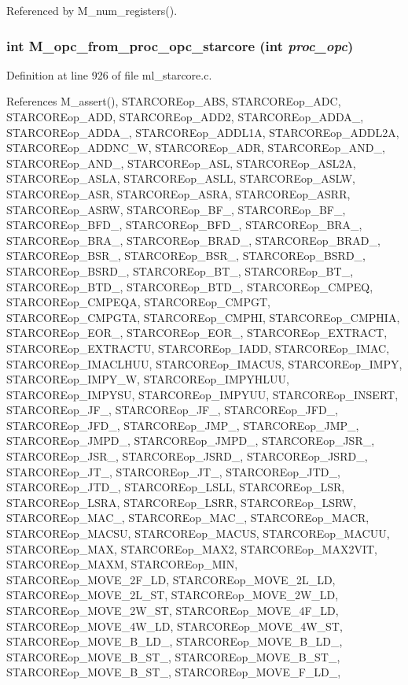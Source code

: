 Referenced by M\_\-num\_\-registers().
\subsubsection{\setlength{\rightskip}{0pt plus 5cm}int M\_\-opc\_\-from\_\-proc\_\-opc\_\-starcore (int {\em proc\_\-opc})}\label{m__starcore_8h_8dcb2892a44c63d537237a3b93236df3}




Definition at line 926 of file ml\_\-starcore.c.

References M\_\-assert(), STARCOREop\_\-ABS, STARCOREop\_\-ADC, STARCOREop\_\-ADD, STARCOREop\_\-ADD2, STARCOREop\_\-ADDA\_, STARCOREop\_\-ADDA\_, STARCOREop\_\-ADDL1A, STARCOREop\_\-ADDL2A, STARCOREop\_\-ADDNC\_\-W, STARCOREop\_\-ADR, STARCOREop\_\-AND\_, STARCOREop\_\-AND\_, STARCOREop\_\-ASL, STARCOREop\_\-ASL2A, STARCOREop\_\-ASLA, STARCOREop\_\-ASLL, STARCOREop\_\-ASLW, STARCOREop\_\-ASR, STARCOREop\_\-ASRA, STARCOREop\_\-ASRR, STARCOREop\_\-ASRW, STARCOREop\_\-BF\_, STARCOREop\_\-BF\_, STARCOREop\_\-BFD\_, STARCOREop\_\-BFD\_, STARCOREop\_\-BRA\_, STARCOREop\_\-BRA\_, STARCOREop\_\-BRAD\_, STARCOREop\_\-BRAD\_, STARCOREop\_\-BSR\_, STARCOREop\_\-BSR\_, STARCOREop\_\-BSRD\_, STARCOREop\_\-BSRD\_, STARCOREop\_\-BT\_, STARCOREop\_\-BT\_, STARCOREop\_\-BTD\_, STARCOREop\_\-BTD\_, STARCOREop\_\-CMPEQ, STARCOREop\_\-CMPEQA, STARCOREop\_\-CMPGT, STARCOREop\_\-CMPGTA, STARCOREop\_\-CMPHI, STARCOREop\_\-CMPHIA, STARCOREop\_\-EOR\_, STARCOREop\_\-EOR\_, STARCOREop\_\-EXTRACT, STARCOREop\_\-EXTRACTU, STARCOREop\_\-IADD, STARCOREop\_\-IMAC, STARCOREop\_\-IMACLHUU, STARCOREop\_\-IMACUS, STARCOREop\_\-IMPY, STARCOREop\_\-IMPY\_\-W, STARCOREop\_\-IMPYHLUU, STARCOREop\_\-IMPYSU, STARCOREop\_\-IMPYUU, STARCOREop\_\-INSERT, STARCOREop\_\-JF\_, STARCOREop\_\-JF\_, STARCOREop\_\-JFD\_, STARCOREop\_\-JFD\_, STARCOREop\_\-JMP\_, STARCOREop\_\-JMP\_, STARCOREop\_\-JMPD\_, STARCOREop\_\-JMPD\_, STARCOREop\_\-JSR\_, STARCOREop\_\-JSR\_, STARCOREop\_\-JSRD\_, STARCOREop\_\-JSRD\_, STARCOREop\_\-JT\_, STARCOREop\_\-JT\_, STARCOREop\_\-JTD\_, STARCOREop\_\-JTD\_, STARCOREop\_\-LSLL, STARCOREop\_\-LSR, STARCOREop\_\-LSRA, STARCOREop\_\-LSRR, STARCOREop\_\-LSRW, STARCOREop\_\-MAC\_, STARCOREop\_\-MAC\_, STARCOREop\_\-MACR, STARCOREop\_\-MACSU, STARCOREop\_\-MACUS, STARCOREop\_\-MACUU, STARCOREop\_\-MAX, STARCOREop\_\-MAX2, STARCOREop\_\-MAX2VIT, STARCOREop\_\-MAXM, STARCOREop\_\-MIN, STARCOREop\_\-MOVE\_\-2F\_\-LD, STARCOREop\_\-MOVE\_\-2L\_\-LD, STARCOREop\_\-MOVE\_\-2L\_\-ST, STARCOREop\_\-MOVE\_\-2W\_\-LD, STARCOREop\_\-MOVE\_\-2W\_\-ST, STARCOREop\_\-MOVE\_\-4F\_\-LD, STARCOREop\_\-MOVE\_\-4W\_\-LD, STARCOREop\_\-MOVE\_\-4W\_\-ST, STARCOREop\_\-MOVE\_\-B\_\-LD\_, STARCOREop\_\-MOVE\_\-B\_\-LD\_, STARCOREop\_\-MOVE\_\-B\_\-ST\_, STARCOREop\_\-MOVE\_\-B\_\-ST\_, STARCOREop\_\-MOVE\_\-B\_\-ST\_, STARCOREop\_\-MOVE\_\-F\_\-LD\_, 